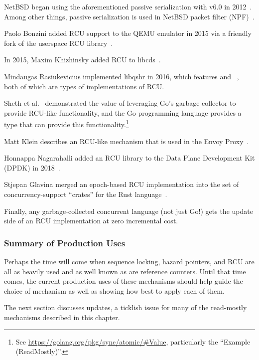 NetBSD began using the aforementioned passive serialization with v6.0 in
2012~\cite{NetBSD2012pserialize}.
Among other things, passive serialization is used in
NetBSD packet filter (NPF)~\cite{MindaugasRasiukevicius2014NPFRCU}.

Paolo Bonzini added RCU support to the QEMU emulator in 2015 via a
friendly fork of the userspace RCU
library~\cite{MikeDay2013RCUqemu,PaoloBonzini2013QEMURCU}.

In 2015, Maxim Khizhinsky added RCU to
libcds~\cite{MaxKhiszinsky2015C++RCU}.

Mindaugas Rasiukevicius implemented libqsbr in 2016, which features
 and
~\cite{MindaugasRasiukevicius2016libqsbr},
both of which are types of implementations of RCU\@.

Sheth et al.~\cite{HarshalSheth2016goRCU}
demonstrated the value of leveraging Go's garbage
collector to provide RCU-like functionality, and
the Go programming language provides a  type that can
provide this functionality.\footnote{
	See \url{https://golang.org/pkg/sync/atomic/\#Value}, particularly
	the ``Example (ReadMostly)''.}

Matt Klein describes an RCU-like mechanism that is used in the Envoy
Proxy~\cite{MattKlein2017EnvoyRCU}.

Honnappa Nagarahalli added an RCU library to the Data Plane Development
Kit (DPDK) in 2018~\cite{HonnappaNagarahalli2018dpdkRCU}.

Stjepan Glavina merged an epoch-based RCU implementation into the
 set of concurrency-support ``crates'' for the Rust
language~\cite{StjepanGlavina2018RustRCU}.

Finally, any garbage-collected concurrent language (not just Go!) gets
the update side of an RCU implementation at zero incremental cost.

\subsubsection{Summary of Production Uses}
\label{sec:defer:Summary of Production Uses}

Perhaps the time will come when sequence locking, hazard pointers, and
RCU are all as heavily used and as well known as are reference counters.
Until that time comes, the current production uses of these mechanisms
should help guide the choice of mechanism as well as showing how best
to apply each of them.

The next section discusses updates, a ticklish issue for many of the
read-mostly mechanisms described in this chapter.

